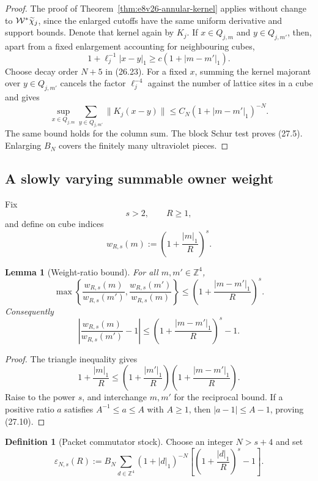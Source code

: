 \documentclass[11pt,oneside]{book}
\newtheorem{lemma}[theorem]{Lemma}
\theoremstyle{definition}
\newtheorem{definition}[theorem]{Definition}
\theoremstyle{remark}
\begin{document}
\begin{proof}
The proof of Theorem~\ref{thm:e8v26-annular-kernel} applies without
change to \({\cal W}^*\widetilde\chi_j\), since the enlarged cutoffs
have the same uniform derivative and support bounds.  Denote that
kernel again by \(K_j\).  If \(x\in Q_{j,m}\) and
\(y\in Q_{j,m'}\), then, apart from a fixed enlargement accounting
for neighbouring cubes,
\[
 1+\ell_j^{-1}|x-y|_1\geq
 c(1+|m-m'|_1).                                                   \tag{27.6}
\]
Choose decay order \(N+5\) in (26.23).  For a fixed \(x\), summing
the kernel majorant over \(y\in Q_{j,m'}\) cancels the factor
\(\ell_j^{-4}\) against the number of lattice sites in a cube and
gives
\[
 \sup_{x\in Q_{j,m}}\sum_{y\in Q_{j,m'}}
 \|K_j(x-y)\|
 \leq C_N(1+|m-m'|_1)^{-N}.
\]
The same bound holds for the column sum.  The block Schur test proves
(27.5).  Enlarging \(B_N\) covers the finitely many ultraviolet
pieces.
\end{proof}

\subsection{A slowly varying summable owner weight}

Fix
\[
                              s>2,\qquad R\geq1,                   \tag{27.7}
\]
and define on cube indices
\[
                     w_{R,s}(m):=
                     \left(1+\frac{|m|_1}{R}\right)^s.            \tag{27.8}
\]

\begin{lemma}[Weight-ratio bound]
\label{lem:e8v27-ratio}
For all \(m,m'\in{\mathbb Z}^4\),
\[
 \max\left\{
 \frac{w_{R,s}(m)}{w_{R,s}(m')},
 \frac{w_{R,s}(m')}{w_{R,s}(m)}
 \right\}
 \leq
 \left(1+\frac{|m-m'|_1}{R}\right)^s.                             \tag{27.9}
\]
Consequently
\[
 \left|\frac{w_{R,s}(m)}{w_{R,s}(m')}-1\right|
 \leq
 \left(1+\frac{|m-m'|_1}{R}\right)^s-1.                           \tag{27.10}
\]
\end{lemma}

\begin{proof}
The triangle inequality gives
\[
 1+\frac{|m|_1}{R}
 \leq
 \left(1+\frac{|m'|_1}{R}\right)
 \left(1+\frac{|m-m'|_1}{R}\right).
\]
Raise to the power \(s\), and interchange \(m,m'\) for the reciprocal
bound.  If a positive ratio \(a\) satisfies \(A^{-1}\leq a\leq A\)
with \(A\geq1\), then \(|a-1|\leq A-1\), proving (27.10).
\end{proof}

\begin{definition}[Packet commutator stock]
\label{def:e8v27-epsilon}
Choose an integer \(N>s+4\) and set
\[
 \varepsilon_{N,s}(R):=
 B_N\sum_{d\in{\mathbb Z}^4}
 (1+|d|_1)^{-N}
 \left[
 \left(1+\frac{|d|_1}{R}\right)^s-1
 \right].                                                        \tag{27.11}
\]
\end{definition}
\end{document}
